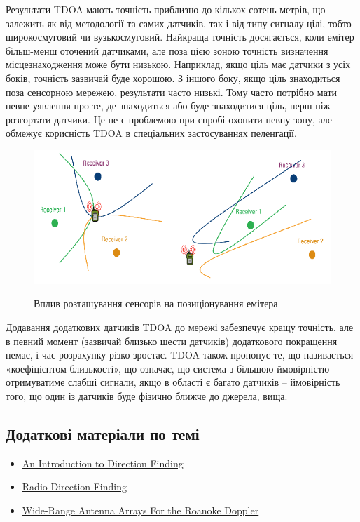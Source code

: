 \documentclass{article}
\begin{document}
Результати TDOA мають точність приблизно до кількох сотень метрів, що залежить як від методології та самих датчиків, так і від типу сигналу цілі, тобто широкосмуговий чи вузькосмуговий. Найкраща точність досягається, коли емітер більш-менш оточений датчиками, але поза цією зоною точність визначення місцезнаходження може бути низькою. Наприклад, якщо ціль має датчики з усіх боків, точність зазвичай буде хорошою. З іншого боку, якщо ціль знаходиться поза сенсорною мережею, результати
часто низькі. Тому часто потрібно мати певне уявлення про те, де знаходиться або
буде знаходитися ціль, перш ніж розгортати датчики. Це не є проблемою при спробі охопити певну зону, але обмежує корисність TDOA в спеціальних застосуваннях пеленгації. 


\begin{figure}[H]
	\centering
	{\includegraphics[width=0.6\linewidth]{images/tdoa_location_impact.png}}
	\caption{Вплив розташування сенсорів на позиціонування емітера}
\end{figure}

Додавання додаткових датчиків TDOA до мережі забезпечує кращу точність, але в певний момент (зазвичай близько шести датчиків) додаткового покращення немає, і час розрахунку різко зростає. TDOA також пропонує те, що називається «коефіцієнтом близькості», що означає, що система з більшою ймовірністю отримуватиме слабші сигнали, якщо в області є багато датчиків – ймовірність того, що один із датчиків буде фізично ближче до джерела, вища.

\subsection{Додаткові матеріали по темі}
\begin{itemize}[noitemsep, topsep=8pt]
	\item \href{https://cdn.rohde-schwarz.com/am/us/campaigns_2/a_d/Intro-to-direction-finding-methodologies~1.pdf}{An Introduction to Direction Finding}
	\item \href{https://www.cryptomuseum.com/df/df.htm}{Radio Direction Finding}	
	\item \href{http://www.homingin.com/newdopant.html}{Wide-Range Antenna Arrays For the Roanoke Doppler}
\end{itemize}
\end{document}
